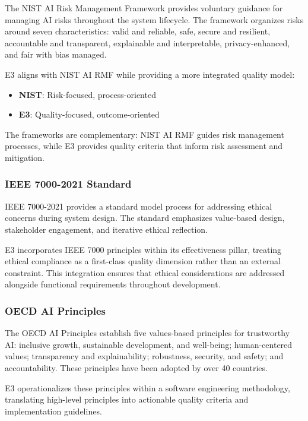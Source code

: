 The NIST AI Risk Management Framework \cite{nistairmf2023} provides voluntary guidance for managing AI risks throughout the system lifecycle. The framework organizes risks around seven characteristics: valid and reliable, safe, secure and resilient, accountable and transparent, explainable and interpretable, privacy-enhanced, and fair with bias managed.

E3 aligns with NIST AI RMF while providing a more integrated quality model:

\begin{itemize}[leftmargin=2em]
    \item \textbf{NIST}: Risk-focused, process-oriented
    \item \textbf{E3}: Quality-focused, outcome-oriented
\end{itemize}

The frameworks are complementary: NIST AI RMF guides risk management processes, while E3 provides quality criteria that inform risk assessment and mitigation.

\subsubsection{IEEE 7000-2021 Standard}

IEEE 7000-2021 \cite{ieee7000:2021} provides a standard model process for addressing ethical concerns during system design. The standard emphasizes value-based design, stakeholder engagement, and iterative ethical reflection.

E3 incorporates IEEE 7000 principles within its effectiveness pillar, treating ethical compliance as a first-class quality dimension rather than an external constraint. This integration ensures that ethical considerations are addressed alongside functional requirements throughout development.

\subsubsection{OECD AI Principles}

The OECD AI Principles \cite{oecdai2019} establish five values-based principles for trustworthy AI: inclusive growth, sustainable development, and well-being; human-centered values; transparency and explainability; robustness, security, and safety; and accountability. These principles have been adopted by over 40 countries.

E3 operationalizes these principles within a software engineering methodology, translating high-level principles into actionable quality criteria and implementation guidelines.

